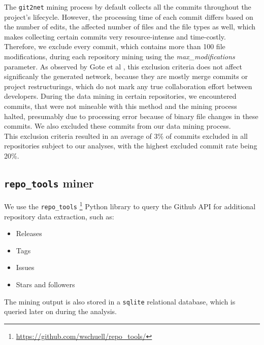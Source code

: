 The \texttt{git2net} mining process by default collects all the commits throughout the project's lifecycle. However, the processing time of each commit differs based on the number of edits, the affected number of files and the file types as well, which makes collecting certain commits very resource-intense and time-costly. Therefore, we exclude every commit, which contains more than 100 file modifications, during each repository mining using the \textit{max\_modifications} parameter. As observed by Gote et al \cite{goteAnalysingTimeStampedCoEditing2019}, this exclusion criteria does not affect significanly the generated network, because they are mostly merge commits or project restructurings, which do not mark any true collaboration effort between developers. During the data mining in certain repositories, we encountered commits, that were not mineable with this method and the mining process halted, presumably due to processing error because of binary file changes in these commits. We also excluded these commits from our data mining process.\\

This exclusion criteria resulted in an average of 3\% of commits excluded in all repositories subject to our analyses, with the highest excluded commit rate being 20\%.

\subsection{\texttt{repo\_tools} miner} 

We use the \texttt{repo\_tools} \footnote{\href{https://github.com/wschuell/repo\_tools/}{https://github.com/wschuell/repo\_tools/}} Python library to query the Github API for additional repository data extraction, such as:

\begin{itemize}
    \item Releases
    \item Tags
    \item Issues
    \item Stars and followers
\end{itemize}

The mining output is also stored in a \texttt{sqlite} relational database, which is queried later on during the analysis. 


